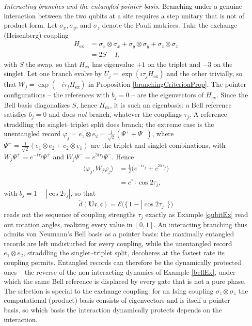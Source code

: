 \documentclass[twoside,11pt,letter]{article}
\def\fc{{\mathfrak{c}}}
\newcommand{\cexp}{\mathcal{E}}  %
\theoremstyle{definition}
\theoremstyle{definition}
\theoremstyle{plain}
\begin{document}
\smallskip
\noindent\emph{Interacting branches and the entangled pointer basis.} Branching under a genuine interaction between the two qubits at a site requires a step unitary that is not of product form. Let $\sigma_x,\sigma_y$, and $\sigma_z$ denote the Pauli matrices. Take the exchange (Heisenberg) coupling
\begin{equation*}
\begin{split}
H_{\mathrm{ex}}&=\sigma_x\otimes\sigma_x+\sigma_y\otimes\sigma_y+\sigma_z\otimes\sigma_z\\
&=2S-I,
\end{split}
\end{equation*}
with $S$ the swap, so that $H_{\mathrm{ex}}$ has eigenvalue $+1$ on the triplet and $-3$ on the singlet. Let one branch evolve by $U_j=\exp(i\tau_j H_{\mathrm{ex}})$ and the other trivially, so that $W_j=\exp(-i\tau_j H_{\mathrm{ex}})$ in Proposition \ref{branchingCriterionProp}. The pointer configurations -- the references with $b_j=0$ -- are the eigenvectors of $H_{\mathrm{ex}}$. Since the Bell basis diagonalizes $S$, hence $H_{\mathrm{ex}}$, it is such an eigenbasis: a Bell reference satisfies $b_j=0$ and does \emph{not} branch, whatever the couplings $\tau_j$. A reference straddling the singlet--triplet split does branch; the extreme case is the unentangled record $\varphi_j=e_1\otimes e_2=\tfrac1{\sqrt2}(\Psi^++\Psi^-)$, where $\Psi^\pm=\tfrac1{\sqrt2}(e_1\otimes e_2\pm e_2\otimes e_1)$ are the triplet and singlet combinations, with $W_j\Psi^+=e^{-i\tau_j}\Psi^+$ and $W_j\Psi^-=e^{3i\tau_j}\Psi^-$. Hence
\begin{equation*}
\begin{split}
\langle\varphi_j,W_j\varphi_j\rangle&=\frac12\big(e^{-i\tau_j}+e^{3i\tau_j}\big)\\
&=e^{i\tau_j}\cos2\tau_j,
\end{split}
\end{equation*}
with $b_j=1-|\cos2\tau_j|$, so that
\begin{equation*}
\tilde d(\mathbf{U}\fc,\fc)=\cexp\big(\{\,1-|\cos2\tau_j|\,\}\big)
\end{equation*}
reads out the sequence of coupling strengths $\tau_j$ exactly as Example \ref{qubitEx} read out rotation angles, realizing every value in $[0,1]$. An interacting branching thus admits von Neumann's Bell basis as a pointer basis: the maximally entangled records are left undisturbed for every coupling, while the unentangled record $e_1\otimes e_2$, straddling the singlet--triplet split, decoheres at the fastest rate its coupling permits. Entangled records can therefore be the dynamically protected ones -- the reverse of the non-interacting dynamics of Example \ref{bellEx}, under which the same Bell reference is displaced by every gate that is not a pure phase. The selection is special to the exchange coupling: for an Ising coupling $\sigma_z\otimes\sigma_z$ the computational (product) basis consists of eigenvectors and is itself a pointer basis, so which basis the interaction dynamically protects depends on the interaction.
\end{document}
